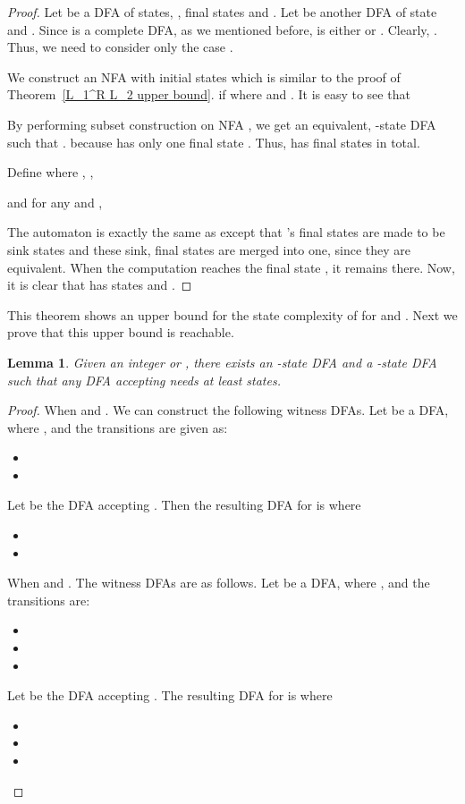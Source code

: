 \documentclass[10pt]{article}
\newtheorem{lemma}{Lemma}
\begin{document}
\begin{proof}
Let  be a DFA of  states,
,  final states and . Let  be another DFA
of  state and . Since  is a complete DFA, as we
mentioned before,  is either  or .
Clearly, . Thus, we need to consider
only the case .

We construct an NFA 
with  initial states which is similar to the proof of
Theorem~\ref{L_1^R L_2 upper bound}.  if
 where  and . It is easy
to see that


By performing subset construction on NFA , we get an equivalent,
-state DFA  such that
.  because 
has only one final state . Thus,  has  final states in total.

Define  where , ,

and for any  and ,

The automaton  is exactly the same as  except that 's
 final states are made to be sink states and these sink,
final states are merged into one, since they are equivalent. When
the computation reaches the final state , it remains there.
Now, it is clear that  has
 states and .
\end{proof}
This theorem shows an upper bound for the state complexity of  for  and . Next we prove that this upper bound
is reachable.

\begin{lemma}
\label{L_1^R L_2 lower bound m=2 or 3 n=1}Given an integer  or
, there exists an -state DFA  and a -state DFA  such
that any DFA accepting  needs at least 
states.
\end{lemma}

\begin{proof}
When  and . We can construct the following witness DFAs.
Let  be a DFA, where
, and the transitions are given as:
\begin{itemize}
\item 
\item 
\end{itemize}
Let  be the DFA accepting . Then the resulting DFA for
 is 
where
\begin{itemize}
\item 
\item 
\end{itemize}

When  and . The witness DFAs are as follows. Let
 be a DFA, where
, and the transitions are:
\begin{itemize}
\item 
\item 
\item 
\end{itemize}
Let  be the DFA accepting . The resulting DFA for
 is  where
\begin{itemize}
\item 
\item 
\item 
\end{itemize}
\end{proof}
\end{document}
